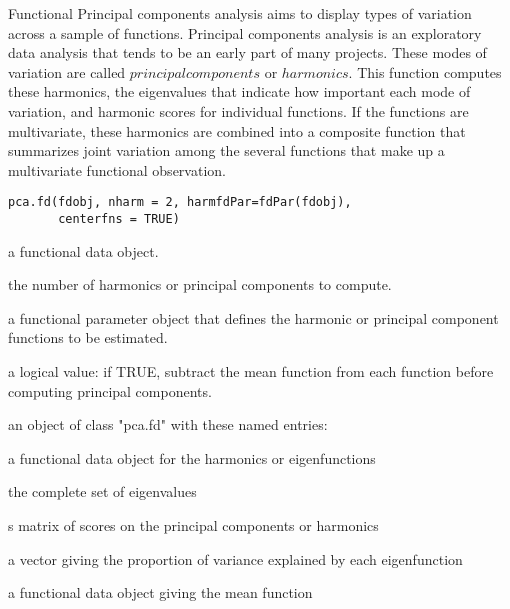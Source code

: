 \documentclass{article}
\begin{document}
\begin{Description}\relax
Functional Principal components analysis aims to display types of
variation across a sample of functions.  Principal components analysis
is an exploratory data analysis that tends to be an early part of many
projects.  These modes of variation are called $principal components$
or $harmonics.$  This function computes these harmonics, the
eigenvalues that indicate how important each mode of variation, and
harmonic scores for individual functions. If the functions are
multivariate, these harmonics are combined into a composite function
that summarizes joint variation among the several functions that make
up a multivariate functional observation.
\end{Description}
\begin{Usage}
\begin{verbatim}
pca.fd(fdobj, nharm = 2, harmfdPar=fdPar(fdobj),
       centerfns = TRUE)
\end{verbatim}
\end{Usage}
\begin{Arguments}
\begin{ldescription}
\item[\code{fdobj}] a functional data object.

\item[\code{nharm}] the number of harmonics or principal components to compute.

\item[\code{harmfdPar}] a functional parameter object that defines the
harmonic or principal component functions to be estimated.

\item[\code{centerfns}] a logical value:
if TRUE, subtract the mean function from each function before
computing principal components.

\end{ldescription}
\end{Arguments}
\begin{Value}
an object of class "pca.fd" with these named entries:

\begin{ldescription}
\item[\code{harmonics}] a functional data object for the harmonics or eigenfunctions

\item[\code{values}] the complete set of eigenvalues

\item[\code{scores}] s matrix of scores on the principal components or harmonics

\item[\code{varprop}] a vector giving the proportion of variance explained
by each eigenfunction

\item[\code{meanfd}] a functional data object giving the mean function

\end{ldescription}
\end{Value}
\end{document}
